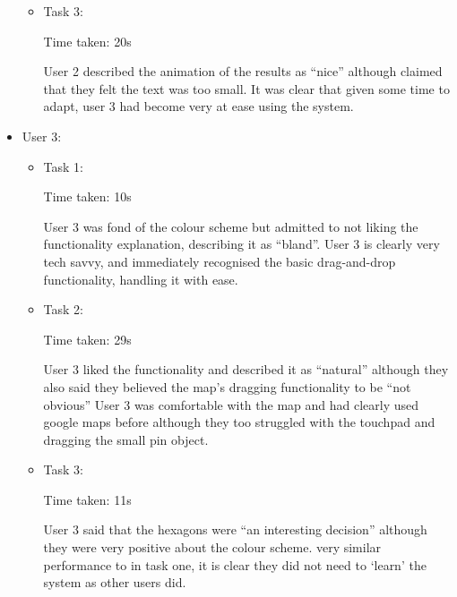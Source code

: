 \documentclass[10pt,a4paper]{article}
\begin{document}
\begin{itemize}
{\begin{itemize}
{Time taken: 67s

User 2 described the functionality as “fairly standard stuff for a professional web-app” although they described the dragging as “unintuitive”, though this may have been down to the input device they were using. 
As with task 1, it was clear that user 2 also had trouble with dragging the pin on the map using the trackpad.}
\item{Task 3:

Time taken: 20s

User 2 described the animation of the results as “nice” although claimed that they felt the text was too small.
It was clear that given some time to adapt, user 3 had become very at ease using the system.}
\end{itemize}}

\item{User 3:
\begin{itemize}
\item{Task 1:

Time taken: 10s

User 3 was fond of the colour scheme but admitted to not liking the functionality explanation, describing it as “bland”.
User 3 is clearly very tech savvy, and immediately recognised the basic drag-and-drop functionality, handling it with ease.}
\item{Task 2:

Time taken: 29s

User 3 liked the functionality and described it as “natural” although they also said they believed the map’s dragging functionality to be “not obvious”
User 3 was comfortable with the map and had clearly used google maps before although they too struggled with the touchpad and dragging the small pin object.}
\item{Task 3:

Time taken: 11s

User 3 said that the hexagons were “an interesting decision” although they were very positive about the colour scheme.
very similar performance to in task one, it is clear they did not need to ‘learn’ the system as other users did.}
\end{itemize}}

\end{itemize}
\end{document}
